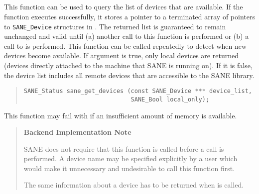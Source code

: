 \documentclass[11pt,DVIps]{report}
\begin{document}
\subsection{}

This function can be used to query the list of devices that are
available.  If the function executes successfully, it stores a pointer
to a  terminated array of pointers to \verb|SANE_Device|
structures in .  The returned list is guaranteed
to remain unchanged and valid until (a) another call to this function
is performed or (b) a call to  is performed.  This
function can be called repeatedly to detect when new devices become
available.  If argument  is true, only local devices
are returned (devices directly attached to the machine that SANE is
running on).  If it is false, the device list includes all remote
devices that are accessible to the SANE library.
\begin{quote}
\begin{verbatim}
SANE_Status sane_get_devices (const SANE_Device *** device_list,
                              SANE_Bool local_only);
\end{verbatim}
\end{quote}

This function may fail with  if an
insufficient amount of memory is available.

\begin{quote}
  \begin{center}
    {\bf Backend Implementation Note}
  \end{center}
  SANE does not require that this function is called before a
   call is performed.  A device name may be
  specified explicitly by a user which would make it unnecessary and
  undesirable to call this function first.
\begin{changebar}
  The same information about
  a device has to be returned when  is called.
\end{changebar}
\end{quote}


\subsection{}
\end{document}
